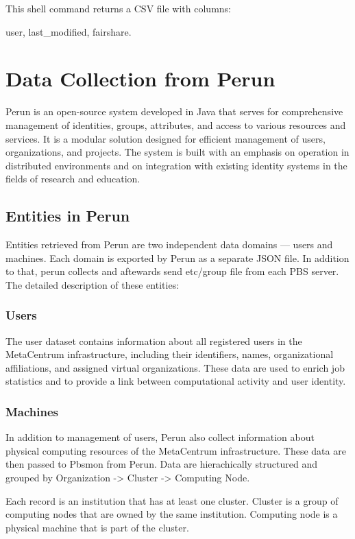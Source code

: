 \documentclass[
  digital,     %
  oneside,     %
  nosansbold,  %
  nocolorbold, %
  lof,         %
  lot,         %
]{fithesis4}
\begin{document}
This shell command returns a CSV file with columns:

user, last\_modified, fairshare.

\newpage
\section{Data Collection from Perun}
Perun is an open-source system developed in Java that serves for comprehensive management of identities, groups, attributes, and access to various resources and services. It is a modular solution designed for efficient management of users, organizations, and projects. The system is built with an emphasis on operation in distributed environments and on integration with existing identity systems in the fields of research and education.\cite{perun2025}

\subsection{Entities in Perun}
\label{subsec:entities-in-perun}
Entities retrieved from Perun are two independent data domains — users and machines. Each domain is exported by Perun as a separate JSON file.
In addition to that, perun collects and aftewards send etc/group file from each PBS server. The detailed description of these entities:

\subsubsection{Users}
\label{subsubsec:users-perun}
The user dataset contains information about all registered users in the MetaCentrum infrastructure, including their identifiers, names, organizational affiliations, and assigned virtual organizations. These data are used to enrich job statistics and to provide a link between computational activity and user identity.

\subsubsection{Machines}
\label{subsubsec:machines-perun}
In addition to management of users, Perun also collect information about physical computing resources of the MetaCentrum infrastructure.
These data are then passed to Pbsmon from Perun. Data are hierachically structured and grouped by Organization -> Cluster -> Computing Node.

Each record is an institution that has at least one cluster. Cluster is a group of computing nodes that are owned by the same institution. Computing node is a physical machine that is part of the cluster.
\end{document}
